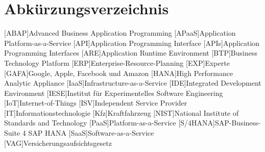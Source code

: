 \clearpage
\chapter*{Abkürzungsverzeichnis}	

\begin{acronym}[XXXXXXX]
	[ABAP]{Advanced Business Application Programming}
	[APaaS]{Application Platform-as-a-Service}
	[API]{Application Programming Interface}
	[APIs]{Application Programming Interfaces}	
	[ARE]{Application Runtime Environment}
	[BTP]{Business Technology Platform}
	[ERP]{Enterprise-Resource-Planning}
	[EXP]{Experte}
	[GAFA]{Google, Apple, Facebook und Amazon}
	[HANA]{High Performance Analytic Appliance}
	[IaaS]{Infrastructure-as-a-Service}
	[IDE]{Integrated Development Environment}
	[IESE]{Institut für Experimentelles Software Engineering}
	[IoT]{Internet-of-Things}
	[ISV]{Independent Service Provider}
	[IT]{Informationstechnologie}
	[Kfz]{Kraftfahrzeug}
	[NIST]{National Institute of Standards and Technology}
	[PaaS]{Platform-as-a-Service}
	[S/4HANA]{SAP-Business-Suite 4 SAP HANA}
	[SaaS]{Software-as-a-Service}
	[VAG]{Versicherungsaufsichtsgesetz}
\end{acronym}